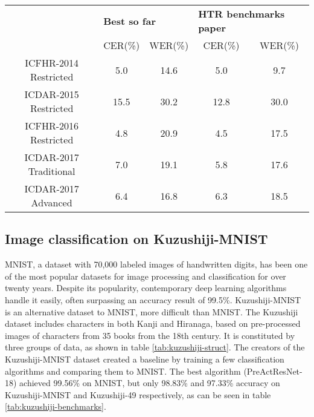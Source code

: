 \begin{table*}[h]
	\begin{tabular}{ccccc}
		\rowcolor[HTML]{EFEFEF}
		\cellcolor[HTML]{EFEFEF}                                     & \multicolumn{2}{l}{\cellcolor[HTML]{EFEFEF}\textbf{Best so far}} & \multicolumn{2}{l}{\cellcolor[HTML]{EFEFEF}\textbf{HTR benchmarks paper}} \\
		\rowcolor[HTML]{EFEFEF}
		\multirow{-2}{*}{\cellcolor[HTML]{EFEFEF}\textbf{Benchmark}} & CER(\%)                         & WER(\%)                        & CER(\%)                             & WER(\%)                             \\
		ICFHR-2014 Restricted                                        & 5.0                             & 14.6                           & 5.0                                 & 9.7                                 \\
		ICDAR-2015 Restricted                                        & 15.5                            & 30.2                           & 12.8                                & 30.0                                \\
		ICFHR-2016 Restricted                                        & 4.8                             & 20.9                           & 4.5                                 & 17.5                                \\
		ICDAR-2017 Traditional                                       & 7.0                             & 19.1                           & 5.8                                 & 17.6                                \\
		ICDAR-2017 Advanced                                          & 6.4                             & 16.8                           & 6.3                                 & 18.5
	\end{tabular}
	\label{tab:htr-benchmarks}
\end{table*}

\subsection{Image classification on Kuzushiji-MNIST}
\label{ssec:imagemnist}

MNIST, a dataset with 70,000 labeled images of handwritten digits, has been one of the most popular datasets for image processing and classification for over twenty years. Despite its popularity, contemporary deep learning algorithms handle it easily, often surpassing an accuracy result of 99.5\%. Kuzushiji-MNIST \cite{Clanuwat2018-vm} is an alternative dataset to MNIST, more difficult than MNIST. The Kuzushiji dataset includes characters in both Kanji and Hiranaga, based on pre-processed images of characters from 35 books from the 18th century. It is constituted by three groups of data, as shown in table \ref{tab:kuzushiji-struct}. The creators of the Kuzushiji-MNIST dataset created a baseline by training a few classification algorithms and comparing them to MNIST. The best algorithm (PreActResNet-18) achieved 99.56\% on MNIST, but only 98.83\% and 97.33\% accuracy on Kuzushiji-MNIST and Kuzushiji-49 respectively, as can be seen in table \ref{tab:kuzushiji-benchmarks}.

